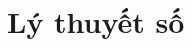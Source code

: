 \documentclass[../h/mo-nt-book.tex]{subfiles}
\begin{document}
\chapter{Lý thuyết số}

\newpage 

 \newpage
 \newpage
 \newpage
\end{document}
